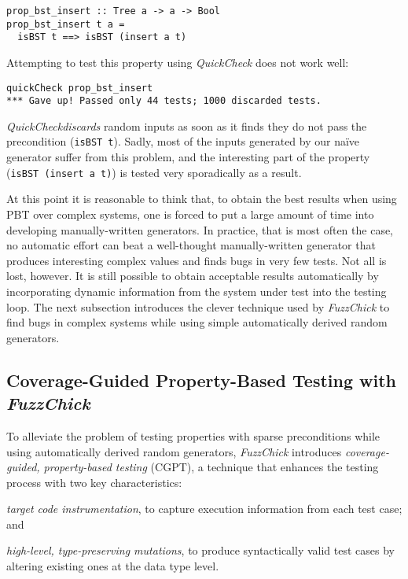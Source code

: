 \documentclass[acmsmall, anonymous]{acmart}
\newcommand{\quickcheck}{\textit{QuickCheck}\xspace}
\newcommand{\fuzzchick}{\textit{FuzzChick}\xspace}
\begin{document}
\begin{verbatim}
prop_bst_insert :: Tree a -> a -> Bool
prop_bst_insert t a =
  isBST t ==> isBST (insert a t)
\end{verbatim}

\noindent Attempting to test this property using \quickcheck does not work well:

\begin{verbatim}
quickCheck prop_bst_insert
*** Gave up! Passed only 44 tests; 1000 discarded tests.
\end{verbatim}

\noindent \quickcheck \emph{discards} random inputs as soon as it finds they do
not pass the precondition (\texttt{isBST t}).
%
Sadly, most of the inputs generated by our na\"ive generator suffer from this
problem, and the interesting part of the property (\texttt{isBST (insert a t)})
is tested very sporadically as a result.


At this point it is reasonable to think that, to obtain the best results when
using PBT over complex systems, one is forced to put a large amount of time into
developing manually-written generators.
%
In practice, that is most often the case, no automatic effort can beat a
well-thought manually-written generator that produces interesting complex values
and finds bugs in very few tests.
%
Not all is lost, however.
%
It is still possible to obtain acceptable results automatically by incorporating
dynamic information from the system under test into the testing loop.
%
The next subsection introduces the clever technique used by \fuzzchick to find
bugs in complex systems while using simple automatically derived random
generators.


\subsection{Coverage-Guided Property-Based Testing with \fuzzchick}

To alleviate the problem of testing properties with sparse preconditions while
using automatically derived random generators, \fuzzchick introduces
\emph{coverage-guided, property-based testing} (CGPT), a technique that enhances
the testing process with two key characteristics:
%
\begin{inparaenum}
\item \emph{target code instrumentation}, to capture execution information from
  each test case; and
\item \emph{high-level, type-preserving mutations}, to produce syntactically
  valid test cases by altering existing ones at the data type level.
\end{inparaenum}
\end{document}
